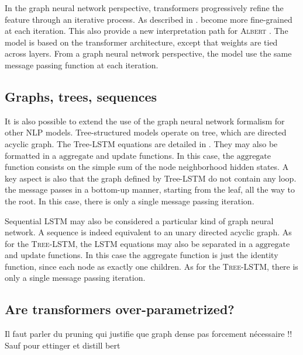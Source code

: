 In the graph neural network perspective, transformers progressively refine the feature through an iterative  process.
As described in \textcite{xin_20}.  become more fine-grained at each iteration.
This also provide a new interpretation path for \textsc{Albert} \parencite{lan_20}.
The model is based on the transformer architecture, except that weights are tied across layers.
From a graph neural network perspective, the model use the same message passing function at each iteration.

\subsection{Graphs, trees, sequences}

It is also possible to extend the use of the graph neural network formalism for other NLP models.
Tree-structured models operate on tree, which are directed acyclic graph.
The Tree-LSTM equations are detailed in . 
They may also be formatted in a $\text{aggregate}$ and $\text{update}$ functions.
In this case, the $\text{aggregate}$ function consists on the simple sum of the node neighborhood hidden states.
A key aspect is also that the graph defined by Tree-LSTM do not contain any loop.
the message passes in a bottom-up manner, starting from the leaf, all the way to the root.
In this case, there is only a single message passing iteration. 

Sequential LSTM may also be considered a particular kind of graph neural network. 
A sequence is indeed equivalent to an unary directed acyclic graph.
As for the \textsc{Tree-LSTM}, the \textsc{LSTM} equations may also be separated in a $\text{aggregate}$ and $\text{update}$ functions.
In this case the $\text{aggregate}$ function is just the identity function, since each node as exactly one children.
As for the \textsc{Tree-LSTM}, there is only a single message passing iteration.

\subsection{Are transformers over-parametrized?}

Il faut parler du pruning qui justifie que graph dense pas forcement nécessaire !! Sauf pour ettinger et distill bert


